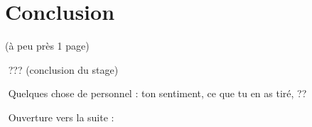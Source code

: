 \chapter{Conclusion}

(à peu près 1 page)

­ ??? (conclusion du stage)

­ Quelques chose de personnel : ton sentiment, ce que tu en as tiré, ??

­ Ouverture vers la suite :
